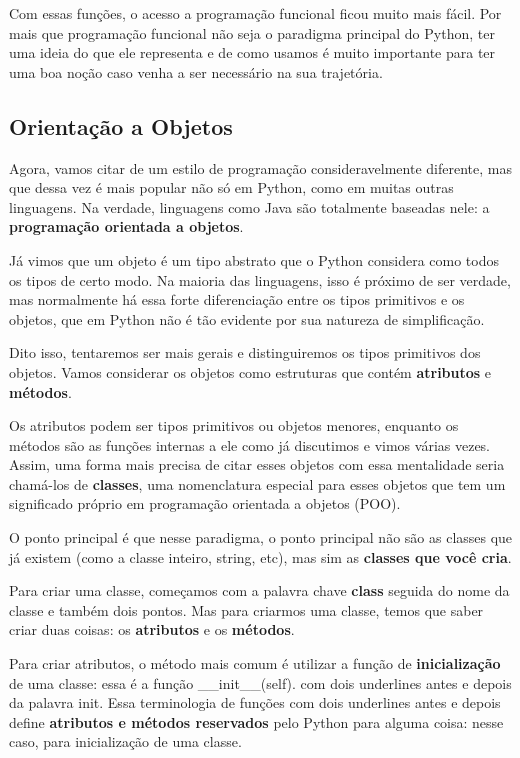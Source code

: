 \documentclass[11pt, a4paper]{article}
\begin{document}
Com essas funções, o acesso a programação funcional ficou muito mais fácil. Por mais que programação funcional não seja o paradigma principal do Python, ter uma ideia do que ele representa e de como usamos é muito importante para ter uma boa noção caso venha a ser necessário na sua trajetória. 

\subsection{Orientação a Objetos}

Agora, vamos citar de um estilo de programação consideravelmente diferente, mas que dessa vez é mais popular não só em Python, como em muitas outras linguagens. Na verdade, linguagens como Java são totalmente baseadas nele: a \textbf{programação orientada a objetos}.

Já vimos que um objeto é um tipo abstrato que o Python considera como todos os tipos de certo modo. Na maioria das linguagens, isso é próximo de ser verdade, mas normalmente há essa forte diferenciação entre os tipos primitivos e os objetos, que em Python não é tão evidente por sua natureza de simplificação.

Dito isso, tentaremos ser mais gerais e distinguiremos os tipos primitivos dos objetos. Vamos considerar os objetos como estruturas que contém \textbf{atributos} e \textbf{métodos}.

Os atributos podem ser tipos primitivos ou objetos menores, enquanto os métodos são as funções internas a ele como já discutimos e vimos várias vezes. Assim, uma forma mais precisa de citar esses objetos com essa mentalidade seria chamá-los de \textbf{classes}, uma nomenclatura especial para esses objetos que tem um significado próprio em programação orientada a objetos (POO).

O ponto principal é que nesse paradigma, o ponto principal não são as classes que já existem (como a classe inteiro, string, etc), mas sim as \textbf{classes que você cria}.

Para criar uma classe, começamos com a palavra chave \textbf{class} seguida do nome da classe e também dois pontos. Mas para criarmos uma classe, temos que saber criar duas coisas: os \textbf{atributos} e os \textbf{métodos}.

Para criar atributos, o método mais comum é utilizar a função de \textbf{inicialização} de uma classe: essa é a função \_\_init\_\_(self). com dois underlines antes e depois da palavra init. Essa terminologia de funções com dois underlines antes e depois define \textbf{atributos e métodos reservados} pelo Python para alguma coisa: nesse caso, para inicialização de uma classe.
\end{document}
